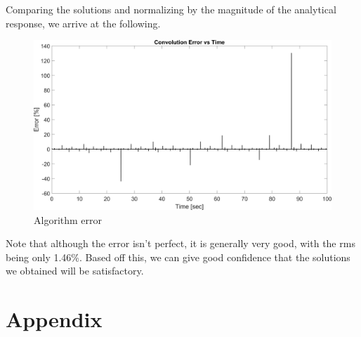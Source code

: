 \documentclass{article}
\begin{document}
\noindent Comparing the solutions and normalizing by the magnitude of the analytical response, we arrive at the following.
\begin{figure}[H]
    \vspace{-10pt}
    \includegraphics[width=1\textwidth,left]{MCHE 6390/Project 2/Figures/Figure_7.png}
    \captionsetup{justification=raggedright,singlelinecheck=false}
    \caption{Algorithm error}
    \label{fig:algerr}
\end{figure}
\noindent Note that although the error isn't perfect, it is generally very good, with the rms being only 1.46\%. Based off this, we can give good confidence that the solutions we obtained will be satisfactory.

\newpage
\section*{Appendix}
\end{document}
